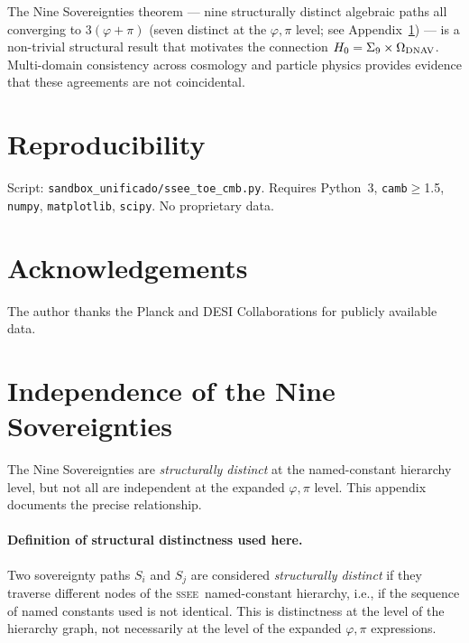 \documentclass[12pt,a4paper]{article}
\newcommand{\SSEE}{\ifmmode\mathrm{SSEE}\else\textsc{ssee}\fi}
\begin{document}
The Nine Sovereignties theorem — nine structurally distinct algebraic paths
all converging to $3(\varphi+\pi)$ (seven distinct at the $\varphi,\pi$ level;
see Appendix~\ref{app:independence}) — is a non-trivial structural result that
motivates the connection $H_0 = \Sigma_9 \times \Omega_{\rm DNAV}$.
Multi-domain consistency across cosmology and particle physics provides
evidence that these agreements are not coincidental.

\section*{Reproducibility}

Script: \texttt{sandbox\_unificado/ssee\_toe\_cmb.py}.
Requires Python~3, \texttt{camb}$\geq$1.5, \texttt{numpy}, \texttt{matplotlib},
\texttt{scipy}.  No proprietary data.

\section*{Acknowledgements}
The author thanks the Planck and DESI Collaborations for publicly available data.

\appendix
\section{Independence of the Nine Sovereignties}
\label{app:independence}

The Nine Sovereignties are \emph{structurally distinct} at the named-constant
hierarchy level, but not all are independent at the expanded $\varphi,\pi$ level.
This appendix documents the precise relationship.

\paragraph{Definition of structural distinctness used here.}
Two sovereignty paths $S_i$ and $S_j$ are considered \emph{structurally distinct} if they
traverse different nodes of the \SSEE\ named-constant hierarchy, i.e., if the
sequence of named constants used is not identical.
This is distinctness at the level of the hierarchy graph, not necessarily at
the level of the expanded $\varphi,\pi$ expressions.
\end{document}
